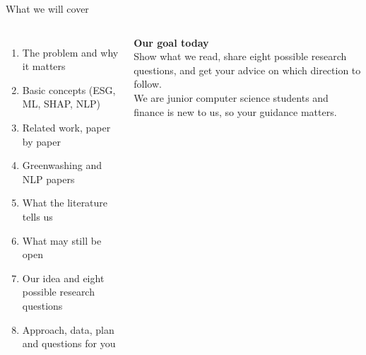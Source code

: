 \documentclass[aspectratio=169,11pt]{beamer}
\begin{document}
\begin{frame}[t]{What we will cover}
\begin{columns}[T]
\begin{enumerate}
\setlength{\itemsep}{5pt}
\item The problem and why it matters
\item Basic concepts (ESG, ML, SHAP, NLP)
\item Related work, paper by paper
\item Greenwashing and NLP papers
\item What the literature tells us
\item What may still be open
\item Our idea and eight possible research questions
\item Approach, data, plan and questions for you
\end{enumerate}
\vspace{0.4cm}
\colorbox{softamber}{\parbox{0.95\textwidth}{\small
\textbf{Our goal today}\\[3pt]
Show what we read, share eight possible research questions, and get your advice on which direction to follow.\\[4pt]We are junior computer science students and finance is new to us, so your guidance matters.}}
\end{columns}
\end{frame}
\end{document}
